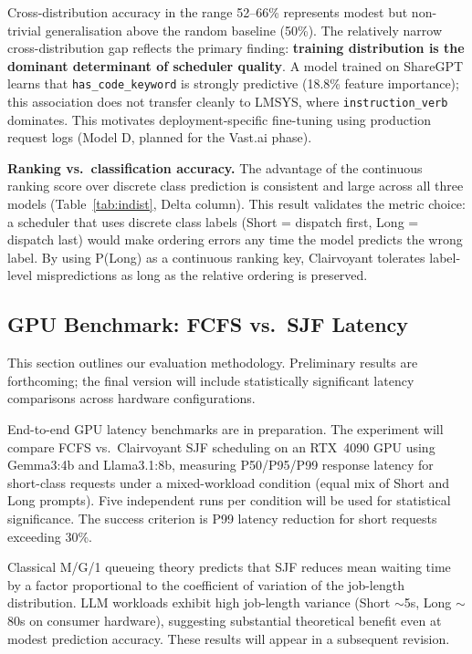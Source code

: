 \documentclass[10pt,letterpaper]{article}
\begin{document}
Cross-distribution accuracy in the range 52--66\% represents modest but non-trivial generalisation above the random baseline (50\%). The relatively narrow cross-distribution gap reflects the primary finding: \textbf{training distribution is the dominant determinant of scheduler quality}. A model trained on ShareGPT learns that \texttt{has\_code\_keyword} is strongly predictive (18.8\% feature importance); this association does not transfer cleanly to LMSYS, where \texttt{instruction\_verb} dominates. This motivates deployment-specific fine-tuning using production request logs (Model D, planned for the Vast.ai phase).

\textbf{Ranking vs.\ classification accuracy.} The advantage of the continuous ranking score over discrete class prediction is consistent and large across all three models (Table~\ref{tab:indist}, Delta column). This result validates the metric choice: a scheduler that uses discrete class labels (Short = dispatch first, Long = dispatch last) would make ordering errors any time the model predicts the wrong label. By using P(Long) as a continuous ranking key, Clairvoyant tolerates label-level mispredictions as long as the relative ordering is preserved.

\subsection{GPU Benchmark: FCFS vs.\ SJF Latency}

This section outlines our evaluation methodology. Preliminary results are forthcoming; the final version will include statistically significant latency comparisons across hardware configurations.

End-to-end GPU latency benchmarks are in preparation. The experiment will compare FCFS vs.\ Clairvoyant SJF scheduling on an RTX~4090 GPU using Gemma3:4b and Llama3.1:8b, measuring P50/P95/P99 response latency for short-class requests under a mixed-workload condition (equal mix of Short and Long prompts). Five independent runs per condition will be used for statistical significance. The success criterion is P99 latency reduction for short requests exceeding 30\%.

Classical M/G/1 queueing theory predicts that SJF reduces mean waiting time by a factor proportional to the coefficient of variation of the job-length distribution. LLM workloads exhibit high job-length variance (Short ${\sim}$5s, Long ${\sim}$80s on consumer hardware), suggesting substantial theoretical benefit even at modest prediction accuracy. These results will appear in a subsequent revision.
\end{document}
